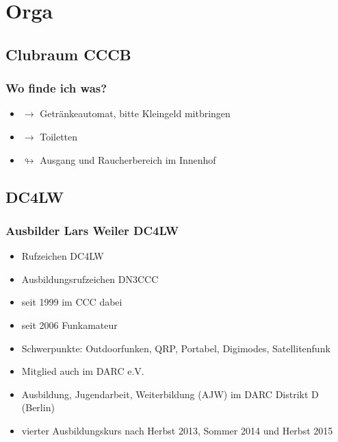 

\usepackage{amssymb}
\subtitle{Organisatorisches 00\\[2em]}
\date{Stand 10.10.2016}



\section{Orga}

\subsection{Clubraum CCCB}

\begin{frame}
    \frametitle{Wo finde ich was?}

    \begin{itemize}
      \item $\rightarrow$ Getränkeautomat, bitte Kleingeld mitbringen
      \item $\longrightarrow$ Toiletten
      \item $\looparrowright$ Ausgang und Raucherbereich im Innenhof
    \end{itemize}
\end{frame}


\subsection{DC4LW}

\begin{frame}
  \frametitle{Ausbilder Lars Weiler DC4LW}

  \begin{itemize}
    \item Rufzeichen DC4LW
    \item Ausbildungsrufzeichen DN3CCC
    \item seit 1999 im CCC dabei
    \item seit 2006 Funkamateur
    \item Schwerpunkte: Outdoorfunken, QRP, Portabel, Digimodes, Satellitenfunk
    \item Mitglied auch im DARC e.V.
    \item Ausbildung, Jugendarbeit, Weiterbildung (AJW) im DARC Distrikt D (Berlin)
    \item vierter Ausbildungskurs nach Herbst 2013, Sommer 2014 und Herbst 2015
  \end{itemize}
\end{frame}

